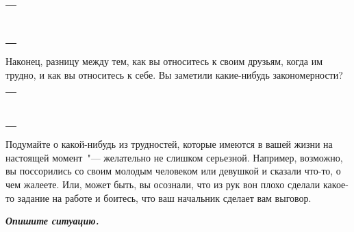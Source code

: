\setlength{\extrarowheight}{2mm}
\begin{tabularx}{\textwidth}{X}
	\\
	\arrayrulecolor{gray}\hline\\
	\hline\\
	\hline\\
	\hline\\
	\hline\\
	\hline\\
	\hline\\	
	\hline\\
	\hline\\
	\hline\\
\end{tabularx}
\setlength{\extrarowheight}{0mm}

\begin{itemize}
	\itemWritingHand Наконец, разницу между тем, как вы относитесь к своим друзьям, когда им трудно, и как вы относитесь к себе. Вы заметили какие-нибудь закономерности?
\end{itemize}

\setlength{\extrarowheight}{2mm}
\begin{tabularx}{\textwidth}{X}
	\\
	\arrayrulecolor{gray}\hline\\
	\hline\\
	\hline\\
	\hline\\
	\hline\\
	\hline\\
	\hline\\	
	\hline\\
	\hline\\
\end{tabularx}
\setlength{\extrarowheight}{0mm}


\newpage
{} \label{Ex:Relating_to_Ourselves_with_Self-Compassion}
\begin{itemize}
	\itemWritingHand Подумайте о какой-нибудь из трудностей, которые имеются в вашей жизни на настоящей момент~"--- желательно не слишком серьезной. Например, возможно, вы поссорились со своим молодым человеком или девушкой и сказали что-то, о чем жалеете. Или, может быть, вы осознали, что из рук вон плохо сделали какое-то задание на работе и боитесь, что ваш начальник сделает вам выговор.
	
	\textbf{\textit{Опишите ситуацию.}}
\end{itemize}

